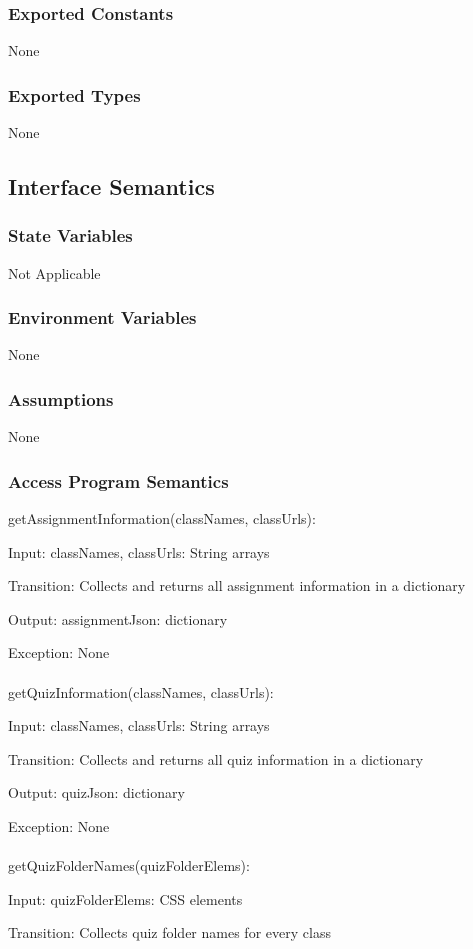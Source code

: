 \documentclass[12pt, titlepage]{article}
\begin{document}
\subsubsection{Exported Constants}
None
\subsubsection{Exported Types}
None
\subsection{Interface Semantics}
\subsubsection{State Variables}
Not Applicable
\subsubsection{Environment Variables}
None
\subsubsection{Assumptions}
None
\subsubsection{Access Program Semantics}
getAssignmentInformation(classNames, classUrls):

    Input: classNames, classUrls: String arrays

    Transition: Collects and returns all assignment information in a dictionary

    Output: assignmentJson: dictionary

    Exception: None
\\
\\
getQuizInformation(classNames, classUrls):

    Input: classNames, classUrls: String arrays

    Transition: Collects and returns all quiz information in a dictionary

    Output: quizJson: dictionary

    Exception: None
\\
\\
getQuizFolderNames(quizFolderElems):
    
    Input: quizFolderElems: CSS elements
    
    Transition: Collects quiz folder names for every class
    
\end{document}
